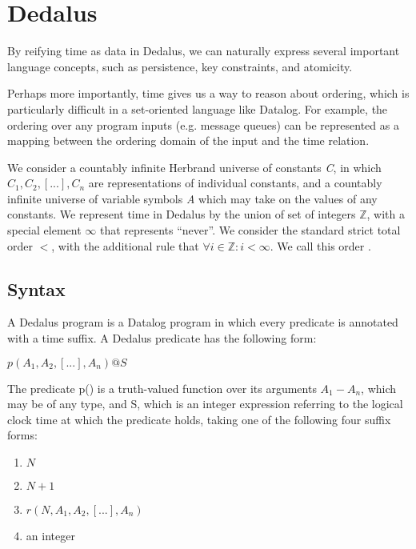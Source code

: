 \section{Dedalus}

By reifying time as data in Dedalus, we can naturally express several important
language concepts, such as persistence, key constraints, and atomicity.

Perhaps more importantly, 
time gives us a way to reason about ordering, which is particularly difficult
in a set-oriented language like Datalog.  For example, the ordering over any
program inputs (e.g. message queues) can be represented as a mapping between
the ordering domain of the input and the time relation.

We consider a countably infinite Herbrand universe of constants \emph{C}, in
which $C_{1}, C_{2}, [...], C_{n}$ are representations of individual constants,
and a countably infinite universe of variable symbols \emph{A} which may take
on the values of any constants.   
%
We represent time in Dedalus by the union of set of integers $\mathbb{Z}$, with
a special element $\infty$ that represents ``never''.  We consider the standard
strict total order $<$, with the additional rule that $\forall i \in
\mathbb{Z}: i < \infty$.  We call this order .

\subsection{Syntax}

A Dedalus program is a Datalog program in which every predicate is annotated with a time suffix.  A Dedalus predicate has the following form:

$p(A_{1}, A_{2}, [...], A_{n})@S$

The predicate p() is a truth-valued function over its arguments $A_{1} - A_{n}$, which may be of any type, and S, which is an integer expression 
referring to the logical clock time at which the predicate holds, taking one of the following four suffix forms:

\begin{enumerate}
\item $N$
\item $N + 1$
\item $r(N, A_{1}, A_{2}, [...], A_{n})$
\item an integer
\end{enumerate}

